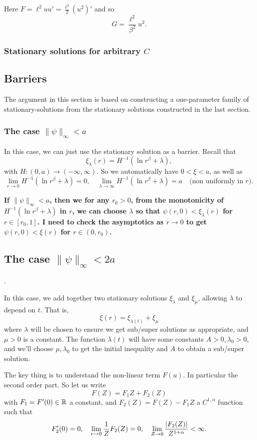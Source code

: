 \documentclass{amsart}
\begin{document}
Here \(F = \ell^2 uu' = \tfrac{\ell^2}{2} (u^2)'\) and so
\[
G = \frac{\ell^2}{\beta^2} u^2.
\]
\subsubsection*{Stationary solutions for arbitrary \(C\)}
\subsection{Barriers}

The argument in this section is based on constructing a one-parameter family of stationary-solutions from the stationary solutions constructed in the last section.

\subsubsection{The case \(\|\psi\|_{\infty} < a\)}

In this case, we can just use the stationary solution as a barrier. Recall that
\[
\xi_{\lambda} (r) = H^{-1} (\ln r^{\beta} + \lambda),
\]
with \(H : (0, a) \to (-\infty, \infty)\). So we automatically have \(0 < \xi < a\), as well as
\[
\lim_{r\to 0} H^{-1} (\ln r^{\beta} + \lambda) = 0, \quad \lim_{\lambda\to\infty} H^{-1}(\ln r^{\beta} + \lambda) = a \quad \text{(non uniformly in \(r\))}.
\]

\textbf{If \(\|\psi\|_{\infty} < a\), then we for any \(r_0 > 0\), from the monotonicity of \(H^{-1} (\ln r^{\beta} + \lambda)\) in \(r\), we can choose \(\lambda\) so that \(\psi(r, 0) < \xi_{\lambda}(r)\) for \(r \in [r_0, 1]\). I need to check the asymptotics as \(r\to 0\) to get \(\psi(r, 0) < \xi(r)\) for \(r \in (0, r_0)\).}

\subsection{The case \(\|\psi\|_{\infty} < 2a\)}.

In this case, we add together two stationary solutions \(\xi_{\lambda}\) and \(\xi_{\mu}\), allowing \(\lambda\) to depend on \(t\). That is,
\[
\xi(r) = \xi_{\lambda(t)} + \xi_{\mu}
\]
where \(\lambda\) will be chosen to ensure we get sub/super solutions as appropriate, and \(\mu > 0\) is a constant. The function \(\lambda(t)\) will have some constants \(A > 0, \lambda_0 > 0\), and we'll choose \(\mu, \lambda_0\) to get the initial inequality and \(A\) to obtain a sub/super solution.

The key thing is to understand the non-linear term \(F(u)\). In particular the second order part. So let us write
\[
F(Z) = F_1 Z + F_2(Z)
\]
with \(F_1 = F'(0) \in \mathbb{R}\) a constant, and \(F_2(Z) = F(Z) - F_1 Z\) a \(C^{1,\alpha}\) function such that
\[
F_2'(0) = 0, \quad \lim_{r\to 0} \frac{1}{Z} F_2(Z) = 0, \quad \lim_{Z\to 0} \frac{\left|{F_2(Z)}\right|}{Z^{1+\alpha}} < \infty.
\]
\end{document}
